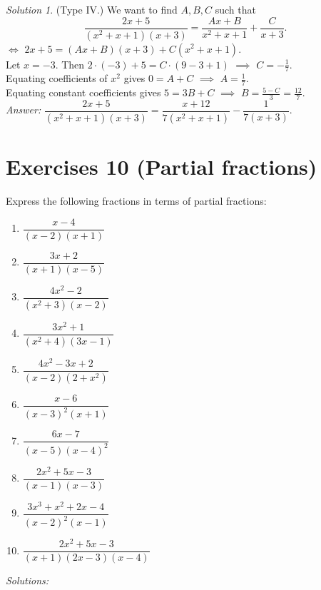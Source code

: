 \documentclass[
  12pt,
  oneside]{book}
\providecommand{\tightlist}{%
  \setlength{\itemsep}{0pt}\setlength{\parskip}{0pt}}
\theoremstyle{definition}
\theoremstyle{definition}
\theoremstyle{definition}
\theoremstyle{definition}
\theoremstyle{remark}
\newtheorem*{solution}{Solution}
\begin{document}
\begin{solution}
(Type IV.) We want to find \(A,B,C\) such that
\[\dfrac{2x+5}{(x^2+x+1)(x+3)}=\dfrac{Ax+B}{x^2+x+1}+\dfrac{C}{x+3}.\]
\(\iff\) \(2x+5=(Ax+B)(x+3)+C(x^2+x+1)\).\\
Let \(x=-3\). Then \(2\cdot(-3)+5=C\cdot(9-3+1)\) \(\implies\) \(C=-\frac17\).\\
Equating coefficients of \(x^2\) gives \(0=A+C\) \(\implies\) \(A=\frac17\).\\
Equating constant coefficients gives \(5=3B+C\) \(\implies\) \(B=\frac{5-C}{3}=\frac{12}7\).\\
\emph{Answer:}
\(\dfrac{2x+5}{(x^2+x+1)(x+3)}=\dfrac{x+12}{7(x^2+x+1)}-\dfrac{1}{7(x+3)}.\)
\end{solution}

\chapter*{Exercises 10 (Partial fractions)}\label{exercises-10-partial-fractions}

Express the following fractions in terms of partial fractions:

\begin{enumerate}
\def\labelenumi{\roman{enumi})}
\tightlist
\item
  \(\dfrac{x-4}{(x-2)(x+1)}\)
\item
  \(\dfrac{3x+2}{(x+1)(x-5)}\)
\item
  \(\dfrac{4x^2-2}{(x^2+3)(x-2)}\)
\item
  \(\dfrac{3x^2+1}{(x^2+4)(3x-1)}\)
\item
  \(\dfrac{4x^2-3x+2}{(x-2)(2+x^2)}\)
\item
  \(\dfrac{x-6}{(x-3)^2(x+1)}\)
\item
  \(\dfrac{6x-7}{(x-5)(x-4)^2}\)
\item
  \(\dfrac{2x^2+5x-3}{(x-1)(x-3)}\)
\item
  \(\dfrac{3x^3+x^2+2x-4}{(x-2)^2(x-1)}\)
\item
  \(\dfrac{2x^2+5x-3}{(x+1)(2x-3)(x-4)}\)
\end{enumerate}

\emph{Solutions:}
\end{document}
